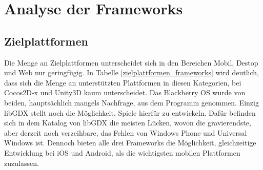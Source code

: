 \chapter{Analyse der Frameworks}

\section{Zielplattformen}
Die Menge an Zielplattformen unterscheidet sich in den Bereichen Mobil, Destop und Web nur geringfügig. In Tabelle \ref{zielplattformen_frameworks} wird deutlich, dass sich die Menge an unterstützten Plattformen in diesen Kategorien, bei Cocos2D-x und Unity3D kaum unterscheidet. Das Blackberry OS wurde von beiden, hauptsächlich mangels Nachfrage, aus dem Programm genommen. Einzig libGDX stellt noch die Möglichkeit, Spiele hierfür zu entwickeln. Dafür befinden sich in dem Katalog von libGDX die meisten Lücken, wovon die gravierendste, aber derzeit noch verzeihbare, das Fehlen von Windows Phone und Universal Windows ist. Dennoch bieten alle drei Frameworks die Möglichkeit, gleichzeitige Entwicklung bei iOS und Android, als die wichtigsten mobilen Plattformen zuzulassen. 

